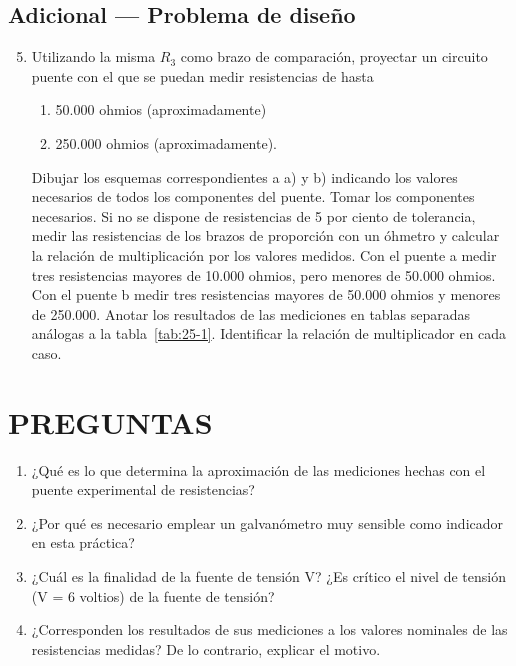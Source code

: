 \documentclass{article}
\numberwithin{equation}{subsection}
\numberwithin{figure}{section}
\numberwithin{table}{section}
\begin{document}
\subsection{Adicional — Problema de diseño}
\begin{enumerate}
    \setcounter{enumi}{4}
    \item Utilizando la misma $R_3$ como brazo de comparación, proyectar un circuito puente con el que se puedan medir 
    resistencias de hasta
    \begin{enumerate}
        \item 50.000 ohmios (aproximadamente)
        \item 250.000 ohmios (aproximadamente).
    \end{enumerate}
    Dibujar los esquemas correspondientes a a) y b) indicando los valores necesarios de todos los componentes 
    del puente. Tomar los componentes necesarios. Si no se dispone de resistencias de 5 por ciento de tolerancia, 
    medir las resistencias de los brazos de proporción con un óhmetro y calcular la relación de multiplicación 
    por los valores medidos. Con el puente a medir tres resistencias mayores de 10.000 ohmios, pero menores 
    de 50.000 ohmios. Con el puente b medir tres resistencias mayores de 50.000 ohmios y menores de 250.000.
    Anotar los resultados de las mediciones en tablas separadas análogas a la tabla~\ref{tab:25-1}. Identificar la relación 
    de multiplicador en cada caso.
\end{enumerate}

\section{PREGUNTAS}
\begin{enumerate}
    \item ¿Qué es lo que determina la aproximación de las mediciones hechas con el puente experimental de resistencias?
    \item ¿Por qué es necesario emplear un galvanómetro muy sensible como indicador en esta práctica?
    \item ¿Cuál es la finalidad de la fuente de tensión V? ¿Es crítico el nivel de tensión (V = 6 voltios) de la 
    fuente de tensión?
    \item ¿Corresponden los resultados de sus mediciones a los valores nominales de las resistencias medidas? De lo 
    contrario, explicar el motivo.
\end{enumerate}

\end{document}
